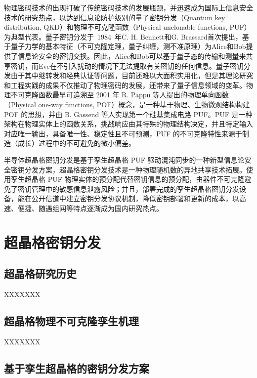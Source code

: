 物理密码技术的出现打破了传统密码技术的发展瓶颈，并迅速成为国际上信息安全技术的研究热点，以达到信息论防护级别的量子密钥分发（Quantum key distribution, QKD）和物理不可克隆函数（Physical unclonable functions, PUF）为典型代表。量子密钥分发于~1984~年C. H. Bennett和G. Brassard首次提出，基于量子力学的基本特征（不可克隆定理，量子纠缠，测不准原理）为Alice和Bob提供了信息论安全的密钥交换\cite{bb84first,shor2000simple}。因此，Alice和Bob可以基于量子态的传输和测量来共享密钥，而Eve在不引入扰动的情况下无法提取有关密钥的任何信息\cite{gisin2002quantum,liuboliangzi}。量子密钥分发由于其中继转发和经典认证等问题，目前还难以大面积实用化，但是其理论研究和工程实践的成果不仅推动了物理密码的发展，还带来了量子信息领域的变革\cite{xu2020secure,pirandola2020advances,maes2013physically,bennett1992experimental}。物理不可克隆函数最早可追溯至 2001 年 R. Pappu 等人提出的物理单向函数（Physical one-way functions, POF）概念，是一种基于物理、生物微观结构构建 POF 的思想\cite{Pappu2002Physical}，并由 B. Gassend 等人实现第一个硅基集成电路 PUF\cite{gassend2002}。PUF 是一种架构在物理实体上的函数关系，挑战响应由其特殊的物理结构决定，并且特定输入对应唯一输出，具备唯一性、稳定性且不可预测，PUF 的不可克隆特性来源于制造（成长）过程中的不可避免的微小偏差\cite{maes2013physically,halak2018physically}。

半导体超晶格密钥分发是基于孪生超晶格 PUF 驱动混沌同步的一种新型信息论安全密钥分发方案，超晶格密钥分发技术是一种物理随机数的异地共享技术拓展。使用孪生超晶格 PUF 物理实体的预分配代替密钥信息的预分配，由器件不可克隆避免了密钥管理中的敏感信息泄露风险；并且，部署完成的孪生超晶格密钥分发设备，能在公开信道中建立密钥分发协议机制，降低密钥部署和更新的成本，以高速、便捷、随遇组网等特点逐渐成为国内研究热点\cite{liu2018secret,wu2020experimental}。


\section{超晶格密钥分发}
\subsection{超晶格研究历史} 
XXXXXXX





\subsection{超晶格物理不可克隆孪生机理}
XXXXXXX


\subsection{基于孪生超晶格的密钥分发方案}

